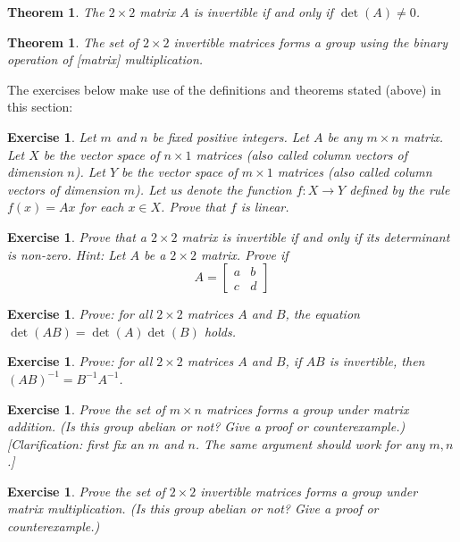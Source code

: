\documentclass{book}
\newcounter{ekcounter}%
\theoremstyle{ekimcustom}
\newtheorem{theorem}[ekcounter]{Theorem}
\newtheorem{exercise}[ekcounter]{Exercise}
\begin{document}
\begin{theorem}
The $2 \times 2$ matrix $A$ is invertible if and only if $\det(A) \not=0$.
\end{theorem}

\begin{theorem}
The set of $2 \times 2$ invertible matrices forms a group using the binary operation of [matrix] multiplication.
\end{theorem}

The exercises below make use of the definitions and theorems stated (above) in this section:

\begin{exercise}
Let $m$ and $n$ be fixed positive integers. Let $A$ be any $m \times n$ matrix.
Let $X$ be the vector space of $n \times 1$ matrices (also called column vectors of dimension $n$).
Let $Y$ be the vector space of $m \times 1$ matrices (also called column vectors of dimension $m$).
Let us denote the function $f : X \to Y$ defined by the rule $f(x)=Ax$ for each $x \in X$.
Prove that $f$ is linear.
\end{exercise}

\begin{exercise}
Prove that a $2 \times 2$ matrix is invertible if and only if its determinant is non-zero. Hint: Let $A$ be a $2 \times 2$ matrix. Prove if
\[A = \left[\begin{array}{cc}a&b\\c&d\end{array}\right]\]
\end{exercise}

\begin{exercise}
Prove: for all $2 \times 2$ matrices $A$ and $B$, the equation $\det(AB)=\det(A)\det(B)$ holds.
\end{exercise}

\begin{exercise}
Prove: for all $2 \times 2$ matrices $A$ and $B$, if $AB$ is invertible, then $(AB)^{-1}=B^{-1}A^{-1}$.
\end{exercise}

\begin{exercise}
Prove the set of $m \times n$ matrices forms a group under matrix addition. (Is this group abelian or not? Give a proof or counterexample.) [Clarification: first fix an $m$ and $n$. The same argument should work for any $m,n$.]
\end{exercise}

\begin{exercise}
Prove the set of $2 \times 2$ invertible matrices forms a group under matrix multiplication. (Is this group abelian or not? Give a proof or counterexample.)
\end{exercise}
\end{document}
